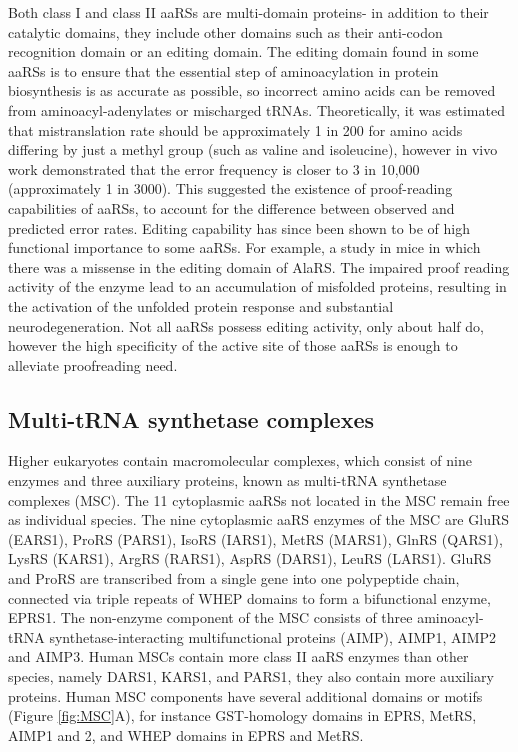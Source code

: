 Both class I and class II aaRSs are multi-domain proteins- in addition to their catalytic domains, they include other domains such as their anti-codon recognition domain or an editing domain.
The editing domain found in some aaRSs is to ensure that the essential step of aminoacylation in protein biosynthesis is as accurate as possible, so incorrect amino acids can be removed from aminoacyl-adenylates or mischarged tRNAs\cite{kwon2019aminoacyl}.
Theoretically, it was estimated that mistranslation rate should be approximately 1 in 200 for amino acids differing by just a methyl group (such as valine and isoleucine)\cite{pauling1958festschrift}, however in vivo work demonstrated that the error frequency is closer to 3 in 10,000 (approximately 1 in 3000)\cite{loftfield1972frequency}.
This suggested the existence of proof-reading capabilities of aaRSs, to account for the difference between observed and predicted error rates.
Editing capability has since been shown to be of high functional importance to some aaRSs.
For example, a study in mice in which there was a missense in the editing domain of AlaRS\cite{lee2006editing}.
The impaired proof reading activity of the enzyme lead to an accumulation of misfolded proteins, resulting in the activation of the unfolded protein response and substantial neurodegeneration\cite{lee2006editing}.
Not all aaRSs possess editing activity, only about half do, however the high specificity of the active site of those aaRSs is enough to alleviate proofreading need.

\subsection{Multi-tRNA synthetase complexes}
Higher eukaryotes contain macromolecular complexes, which consist of nine enzymes and three auxiliary proteins, known as multi-tRNA synthetase complexes (MSC).
The 11 cytoplasmic aaRSs not located in the MSC remain free as individual species.
The nine cytoplasmic aaRS enzymes of the MSC are GluRS (EARS1), ProRS (PARS1), IsoRS (IARS1), MetRS (MARS1), GlnRS (QARS1), LysRS (KARS1), ArgRS (RARS1), AspRS (DARS1), LeuRS (LARS1).
GluRS and ProRS are transcribed from a single gene into one polypeptide chain, connected via triple repeats of WHEP domains to form a bifunctional enzyme, EPRS1.
The non-enzyme component of the MSC consists of three aminoacyl-tRNA synthetase-interacting multifunctional proteins (AIMP), AIMP1, AIMP2 and AIMP3.
Human MSCs contain more class II aaRS enzymes than other species, namely DARS1, KARS1, and PARS1, they also contain more auxiliary proteins.
Human MSC components have several additional domains or motifs (Figure \ref{fig:MSC}A), for instance GST-homology domains in EPRS, MetRS, AIMP1 and 2, and WHEP domains in EPRS and MetRS\cite{kim2019evolution, khan20203, kim2020structures}.

